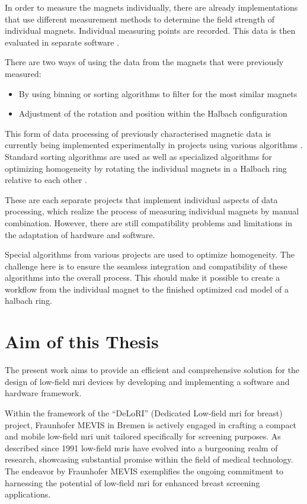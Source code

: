 In order to measure the magnets individually, there are already
implementations that use different measurement methods to determine the
field strength of individual magnets. Individual measuring points are
recorded. This data is then evaluated in separate software
\cite{Wickenbrock_2021}.

There are two ways of using the data from the magnets that were
previously measured:

\begin{itemize}
\tightlist
\item
  By using binning or sorting algorithms to filter for the most similar
  magnets
\item
  Adjustment of the rotation and position within the Halbach
  configuration
\end{itemize}

This form of data processing of previously characterised magnetic data
is currently being implemented experimentally in projects using various
algorithms \cite{Wickenbrock_2021}. Standard sorting algorithms are
used as well as specialized algorithms for optimizing homogeneity by
rotating the individual magnets in a Halbach ring relative to each other
\cite{HalbachMRIDesigner}.

These are each separate projects that implement individual aspects of
data processing, which realize the process of measuring individual
magnets by manual combination. However, there are still compatibility
problems and limitations in the adaptation of hardware and software.

Special algorithms from various projects are used to optimize
homogeneity. The challenge here is to ensure the seamless integration
and compatibility of these algorithms into the overall process. This
should make it possible to create a workflow from the individual magnet
to the finished optimized \gls{cad} model of a halbach ring.

\hypertarget{aim-of-this-thesis}{%
\section{Aim of this Thesis}\label{aim-of-this-thesis}}

The present work aims to provide an efficient and comprehensive solution
for the design of low-field \gls{mri} devices by developing and
implementing a software and hardware framework.

Within the framework of the ``DeLoRI'' (Dedicated Low-field \gls{mri}
for breast) project, Fraunhofer MEVIS in Bremen is actively engaged in
crafting a compact and mobile low-field \gls{mri} unit tailored
specifically for screening purposes. As described since 1991 low-field
\gls{mri}s have evolved into a burgeoning realm of research, showcasing
substantial promise within the field of medical technology. The endeavor
by Fraunhofer MEVIS exemplifies the ongoing commitment to harnessing the
potential of low-field \gls{mri} for enhanced breast screening
applications.

